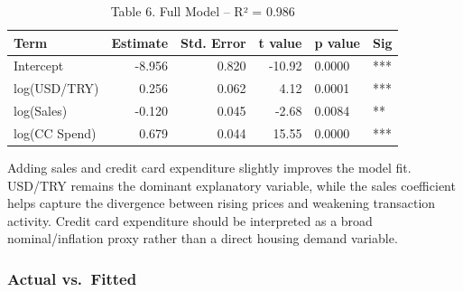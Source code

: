 \documentclass[
  11pt,
  a4paper,
]{article}
\newenvironment{Shaded}{\begin{snugshade}}{\end{snugshade}}
\newcommand{\AttributeTok}[1]{\textcolor[rgb]{0.40,0.45,0.13}{#1}}
\newcommand{\ConstantTok}[1]{\textcolor[rgb]{0.56,0.35,0.01}{#1}}
\newcommand{\FunctionTok}[1]{\textcolor[rgb]{0.28,0.35,0.67}{#1}}
\newcommand{\NormalTok}[1]{\textcolor[rgb]{0.00,0.23,0.31}{#1}}
\newcommand{\SpecialCharTok}[1]{\textcolor[rgb]{0.37,0.37,0.37}{#1}}
\newcommand{\StringTok}[1]{\textcolor[rgb]{0.13,0.47,0.30}{#1}}
\begin{document}
\begin{Shaded}
\end{Shaded}

\begin{longtable}[t]{lrrrll}
\caption{\label{tab:model2}Table 6. Full Model – R² = 0.986}\\
\toprule
Term & Estimate & Std. Error & t value & p value & Sig\\
\midrule
Intercept & -8.956 & 0.820 & -10.92 & 0.0000 & ***\\
log(USD/TRY) & 0.256 & 0.062 & 4.12 & 0.0001 & ***\\
log(Sales) & -0.120 & 0.045 & -2.68 & 0.0084 & **\\
log(CC Spend) & 0.679 & 0.044 & 15.55 & 0.0000 & ***\\
\bottomrule
\end{longtable}

Adding sales and credit card expenditure slightly improves the model
fit. USD/TRY remains the dominant explanatory variable, while the sales
coefficient helps capture the divergence between rising prices and
weakening transaction activity. Credit card expenditure should be
interpreted as a broad nominal/inflation proxy rather than a direct
housing demand variable.

\subsubsection{Actual vs.~Fitted}\label{actual-vs.-fitted}
\end{document}
